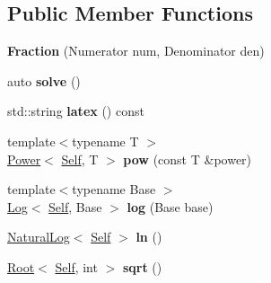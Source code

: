 \subsection*{Public Member Functions}
\begin{DoxyCompactItemize}
\item 
\hypertarget{classlatex_1_1math_1_1Fraction_ac7e62595c28e64ef4fc9fb622216dbc9}{{\bfseries Fraction} (Numerator num, Denominator den)}\label{classlatex_1_1math_1_1Fraction_ac7e62595c28e64ef4fc9fb622216dbc9}

\item 
\hypertarget{classlatex_1_1math_1_1Fraction_af7a4255e44caaf99035d77d4fd66b622}{auto {\bfseries solve} ()}\label{classlatex_1_1math_1_1Fraction_af7a4255e44caaf99035d77d4fd66b622}

\item 
\hypertarget{classlatex_1_1math_1_1Fraction_a5675fc996d2830ad3bf1cee4f1d1a697}{std\-::string {\bfseries latex} () const }\label{classlatex_1_1math_1_1Fraction_a5675fc996d2830ad3bf1cee4f1d1a697}

\item 
\hypertarget{classlatex_1_1math_1_1Fraction_a0a3fa9f83049f7bdab927a1bd960b5e9}{{\footnotesize template$<$typename T $>$ }\\\hyperlink{classlatex_1_1math_1_1Power}{Power}$<$ \hyperlink{classlatex_1_1math_1_1Fraction}{Self}, T $>$ {\bfseries pow} (const T \&power)}\label{classlatex_1_1math_1_1Fraction_a0a3fa9f83049f7bdab927a1bd960b5e9}

\item 
\hypertarget{classlatex_1_1math_1_1Fraction_a080092ade7e2ef160101bc20183cc34c}{{\footnotesize template$<$typename Base $>$ }\\\hyperlink{classlatex_1_1math_1_1Log}{Log}$<$ \hyperlink{classlatex_1_1math_1_1Fraction}{Self}, Base $>$ {\bfseries log} (Base base)}\label{classlatex_1_1math_1_1Fraction_a080092ade7e2ef160101bc20183cc34c}

\item 
\hypertarget{classlatex_1_1math_1_1Fraction_a70d16ff357336b72a85d6267c62eacd0}{\hyperlink{classlatex_1_1math_1_1NaturalLog}{Natural\-Log}$<$ \hyperlink{classlatex_1_1math_1_1Fraction}{Self} $>$ {\bfseries ln} ()}\label{classlatex_1_1math_1_1Fraction_a70d16ff357336b72a85d6267c62eacd0}

\item 
\hypertarget{classlatex_1_1math_1_1Fraction_ae34b20e7e198a4e46e6ecb72a6b0aa1b}{\hyperlink{classlatex_1_1math_1_1Root}{Root}$<$ \hyperlink{classlatex_1_1math_1_1Fraction}{Self}, int $>$ {\bfseries sqrt} ()}\label{classlatex_1_1math_1_1Fraction_ae34b20e7e198a4e46e6ecb72a6b0aa1b}

\end{DoxyCompactItemize}
